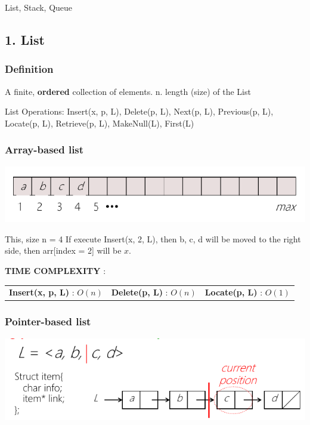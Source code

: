 \begin{section}
    {List, Stack, Queue}


\subsection*{1. List}

\subsubsection*{Definition}
A finite, \textbf{ordered} collection of elements. n. length (size) of the List

\bigskip\noindent
List Operations: Insert(x, p, L), Delete(p, L), Next(p, L), Previous(p, L), Locate(p, L), Retrieve(p, L), MakeNull(L), First(L)

\subsubsection*{Array-based list}

\begin{center}
    \includegraphics[]{img/arraybasedlist.png}
\end{center}
This, size n = 4
\bigskip
If execute Insert(x, 2, L), then b, c, d will be moved to the right side, then arr[index = 2] will be $x$.

\textbf{TIME COMPLEXITY} :
\begin{tabular}{ccc}
    \textbf{Insert(x, p, L)} : $O(n)$ & \textbf{Delete(p, L)} : $O(n)$ & \textbf{Locate(p, L)} : $O(1)$
\end{tabular}

\subsubsection*{Pointer-based list}

\begin{center}
    \includegraphics[]{img/pointerbasedlist.png}
\end{center}


\end{section}

